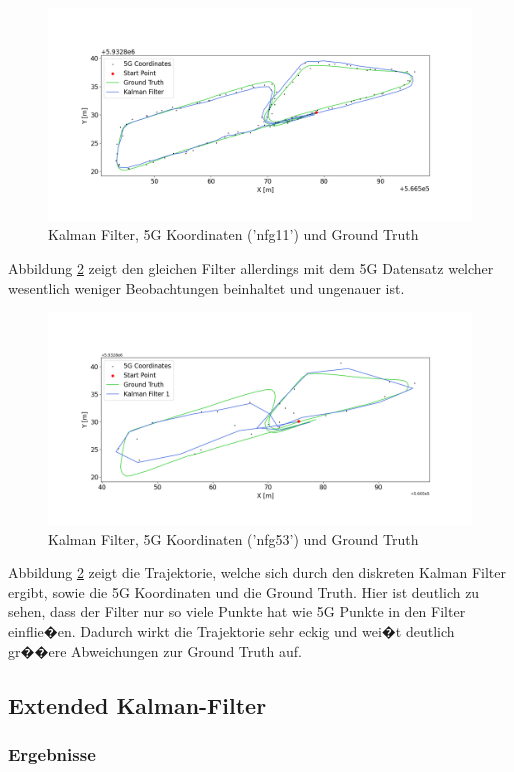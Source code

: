 \begin{figure}[h!]
	\centering
	\includegraphics[width=0.8\linewidth]{source/images/kf_11}
	\caption{Kalman Filter, 5G Koordinaten ('nfg11') und Ground Truth}
	\label{fig:kf_11}
\end{figure}
Abbildung \ref{fig:kf_53} zeigt den gleichen Filter allerdings mit dem 5G Datensatz welcher wesentlich weniger Beobachtungen beinhaltet und ungenauer ist. 
\begin{figure}[h!]
	\centering
	\includegraphics[width=0.8\linewidth]{source/images/kf_53}
	\caption{Kalman Filter, 5G Koordinaten ('nfg53') und Ground Truth}
	\label{fig:kf_53}
\end{figure}
Abbildung \ref{fig:kf_53} zeigt die Trajektorie, welche sich durch den diskreten Kalman Filter ergibt, sowie die 5G Koordinaten und die Ground Truth. Hier ist deutlich zu sehen, dass der Filter nur so viele Punkte hat wie 5G Punkte in den Filter einflie�en. Dadurch wirkt die Trajektorie sehr eckig und wei�t deutlich gr��ere Abweichungen zur Ground Truth auf.
\subsection{Extended Kalman-Filter}
\subsubsection{Ergebnisse}
